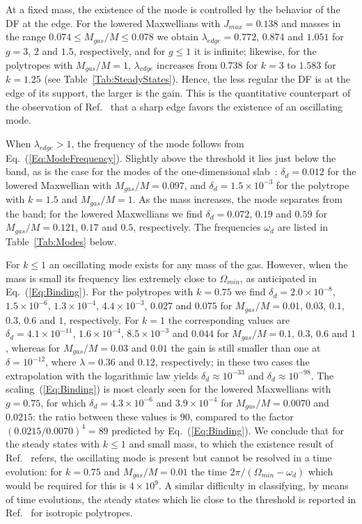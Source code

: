 At a fixed mass, the existence of the mode is controlled by the behavior of the DF at the edge. For the lowered Maxwellians with $J_{max} = 0.138$ and masses in the range $0.074\leq M_{gas}/M\leq 0.078$ we obtain $\lambda_{edge} = 0.772$, $0.874$ and $1.051$ for $g = 3$, $2$ and $1.5$, respectively, and for $g\leq 1$ it is infinite; likewise, for the polytropes with $M_{gas}/M = 1$, $\lambda_{edge}$ increases from $0.738$ for $k = 3$ to $1.583$ for $k = 1.25$ (see Table~\ref{Tab:SteadyStates}). Hence, the less regular the DF is at the edge of its support, the larger is the gain. This is the quantitative counterpart of the observation of Ref.~\cite{mW91} that a sharp edge favors the existence of an oscillating mode.

When $\lambda_{edge} > 1$, the frequency of the mode follows from Eq.~(\ref{Eq:ModeFrequency}). Slightly above the threshold it lies just below the band, as is the case for the modes of the one-dimensional slab~\cite{mW91,pL92}: $\delta_d = 0.012$ for the lowered Maxwellian with $M_{gas}/M = 0.097$, and $\delta_d = 1.5\times 10^{-3}$ for the polytrope with $k = 1.5$ and $M_{gas}/M = 1$. As the mass increases, the mode separates from the band; for the lowered Maxwellians we find $\delta_d = 0.072$, $0.19$ and $0.59$ for $M_{gas}/M = 0.121$, $0.17$ and $0.5$, respectively. The frequencies $\omega_d$ are listed in Table~\ref{Tab:Modes} below.

For $k\leq 1$ an oscillating mode exists for any mass of the gas. However, when the mass is small its frequency lies extremely close to $\Omega_{min}$, as anticipated in Eq.~(\ref{Eq:Binding}). For the polytropes with $k = 0.75$ we find $\delta_d = 2.0\times 10^{-8}$, $1.5\times 10^{-6}$, $1.3\times 10^{-4}$, $4.4\times 10^{-3}$, $0.027$ and $0.075$ for $M_{gas}/M = 0.01$, $0.03$, $0.1$, $0.3$, $0.6$ and $1$, respectively. For $k = 1$ the corresponding values are $\delta_d = 4.1\times 10^{-11}$, $1.6\times 10^{-4}$, $8.5\times 10^{-3}$ and $0.044$ for $M_{gas}/M = 0.1$, $0.3$, $0.6$ and $1$, whereas for $M_{gas}/M = 0.03$ and $0.01$ the gain is still smaller than one at $\delta = 10^{-12}$, where $\lambda = 0.36$ and $0.12$, respectively; in these two cases the extrapolation with the logarithmic law yields $\delta_d\approx 10^{-33}$ and $\delta_d\approx 10^{-98}$. The scaling~(\ref{Eq:Binding}) is most clearly seen for the lowered Maxwellians with $g = 0.75$, for which $\delta_d = 4.3\times 10^{-6}$ and $3.9\times 10^{-4}$ for $M_{gas}/M = 0.0070$ and $0.0215$: the ratio between these values is $90$, compared to the factor $(0.0215/0.0070)^4 = 89$ predicted by Eq.~(\ref{Eq:Binding}). We conclude that for the steady states with $k\leq 1$ and small mass, to which the existence result of Ref.~\cite{mHgRmScS25} refers, the oscillating mode is present but cannot be resolved in a time evolution: for $k = 0.75$ and $M_{gas}/M = 0.01$ the time $2\pi/(\Omega_{min} - \omega_d)$ which would be required for this is $4\times 10^9$. A similar difficulty in classifying, by means of time evolutions, the steady states which lie close to the threshold is reported in Ref.~\cite{cS24} for isotropic polytropes.


